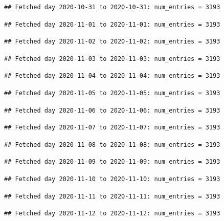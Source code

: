 \documentclass[]{article}
\begin{document}
\begin{verbatim}
## Fetched day 2020-10-31 to 2020-10-31: num_entries = 3193
\end{verbatim}

\begin{verbatim}
## Fetched day 2020-11-01 to 2020-11-01: num_entries = 3193
\end{verbatim}

\begin{verbatim}
## Fetched day 2020-11-02 to 2020-11-02: num_entries = 3193
\end{verbatim}

\begin{verbatim}
## Fetched day 2020-11-03 to 2020-11-03: num_entries = 3193
\end{verbatim}

\begin{verbatim}
## Fetched day 2020-11-04 to 2020-11-04: num_entries = 3193
\end{verbatim}

\begin{verbatim}
## Fetched day 2020-11-05 to 2020-11-05: num_entries = 3193
\end{verbatim}

\begin{verbatim}
## Fetched day 2020-11-06 to 2020-11-06: num_entries = 3193
\end{verbatim}

\begin{verbatim}
## Fetched day 2020-11-07 to 2020-11-07: num_entries = 3193
\end{verbatim}

\begin{verbatim}
## Fetched day 2020-11-08 to 2020-11-08: num_entries = 3193
\end{verbatim}

\begin{verbatim}
## Fetched day 2020-11-09 to 2020-11-09: num_entries = 3193
\end{verbatim}

\begin{verbatim}
## Fetched day 2020-11-10 to 2020-11-10: num_entries = 3193
\end{verbatim}

\begin{verbatim}
## Fetched day 2020-11-11 to 2020-11-11: num_entries = 3193
\end{verbatim}

\begin{verbatim}
## Fetched day 2020-11-12 to 2020-11-12: num_entries = 3193
\end{verbatim}
\end{document}
